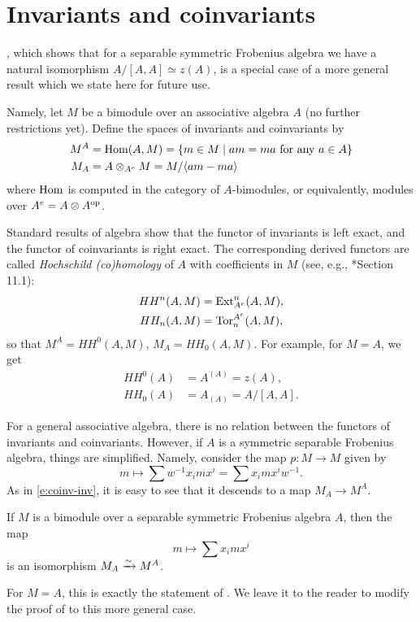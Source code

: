 \section{Invariants and coinvariants}\label{s:invariants}
, which shows that for a separable symmetric Frobenius
algebra we have a natural isomorphism $A/[A,A]\simeq z(A)$, is a special
case of a more general result which we state here for future use.

Namely, let $M$ be a bimodule over an associative algebra $A$ (no further
restrictions yet). Define the spaces of invariants and coinvariants by
\begin{equation}\label{e:coinv}
  \begin{aligned}
    M^{A}&=\operatorname{Hom}(A,M)=\{m\in M\; | \; am=ma \text{ for any } a\in A\}\\
    M_{A}&=A\otimes_{A^e} M = M/\langle am-ma\rangle
  \end{aligned}
\end{equation}
where $\operatorname{Hom}$ is computed in the category of $A$-bimodules, or
equivalently, modules over $A^e=A\otimes A^{\mathrm{op}}$.

Standard results of algebra show that the functor of invariants is left
exact, and the functor of coinvariants is right exact. The corresponding
derived functors are called \emph{Hochschild (co)homology} of $A$ with
coefficients in $M$ (see, e.g., *{Section 11.1}):
\begin{align*}
  HH^n(A,M)&=\operatorname{Ext}_{A^e}^n(A,M),\\
  HH_n(A,M)&=\operatorname{Tor}^{A^e}_n(A,M),
\end{align*}
so that $M^{A}=HH^0(A,M)$, $M_{A}=HH_0(A,M)$.
For example, for $M=A$, we get
\begin{align*}
  HH^0(A)&=A^{(A)}=z(A),\\
  HH_0(A)&=A_{(A)}= A/[A,A].
\end{align*}

For a general associative algebra, there is no relation between the functors of
invariants and coinvariants. However, if $A$ is a symmetric separable Frobenius
algebra, things are simplified. Namely, consider the map $p\colon M\to M$ given
by
$$
  m\mapsto \sum w^{-1} x_imx^i=\sum x_imx^i w^{-1}.
$$
As in \eqref{e:coinv-inv}, it is easy to see that it descends to a map
$M_{A}\to M^{A}$.
\begin{lemma}\label{l:coinv-separable}
  If $M$ is a bimodule over a separable symmetric Frobenius algebra $A$, then
  the map
  $$
  m \mapsto \sum x_imx^i
  $$
  is an isomorphism $M_{A}\xrightarrow{\sim} M^{A}$.
  \end{lemma}
For $M=A$, this is exactly the statement of . We leave it
to the reader to modify the proof of  to this more general
case.



